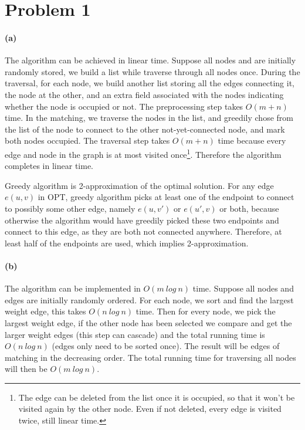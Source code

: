 \documentclass[12pt]{article}
\begin{document}
\section*{Problem 1}
\paragraph{(a)} The algorithm can be achieved in linear time. Suppose all nodes and are initially randomly stored, we build a list while traverse through all nodes once. During the traversal, for each node, we build another list storing all the edges connecting it, the node at the other, and an extra field associated with the nodes indicating whether the node is occupied or not. The preprocessing step takes $O(m + n)$ time. In the matching, we traverse the nodes in the list, and greedily chose from the list of the node to connect to the other not-yet-connected node, and mark both nodes occupied. The traversal step takes $O(m + n)$ time because every edge and node in the graph is at most visited once\footnote{The edge can be deleted from the list once it is occupied, so that it won't be visited again by the other node. Even if not deleted, every edge is visited twice, still linear time.}. Therefore the algorithm completes in linear time.

Greedy algorithm is 2-approximation of the optimal solution. For any edge $e(u, v)$ in OPT, greedy algorithm picks at least one of the endpoint to connect to possibly some other edge, namely $e(u, v')$ or $e(u', v)$ or both, because otherwise the algorithm would have greedily picked these two endpoints and connect to this edge, as they are both not connected anywhere. Therefore, at least half of the endpoints are used, which implies 2-approximation. 

\paragraph{(b)} The algorithm can be implemented in $O(m\:log\:n)$ time. Suppose all nodes and edges are initially randomly ordered. For each node, we sort and find the largest weight edge, this takes $O(n\: log\: n)$ time. Then for every node, we pick the largest weight edge, if the other node has been selected we compare and get the larger weight edges (this step can cascade) and the total running time is $O(n\: log\: n)$ (edges only need to be sorted once). The result will be edges of matching in the decreasing order. The total running time for traversing all nodes will then be $O(m\:log\:n)$.
\end{document}

